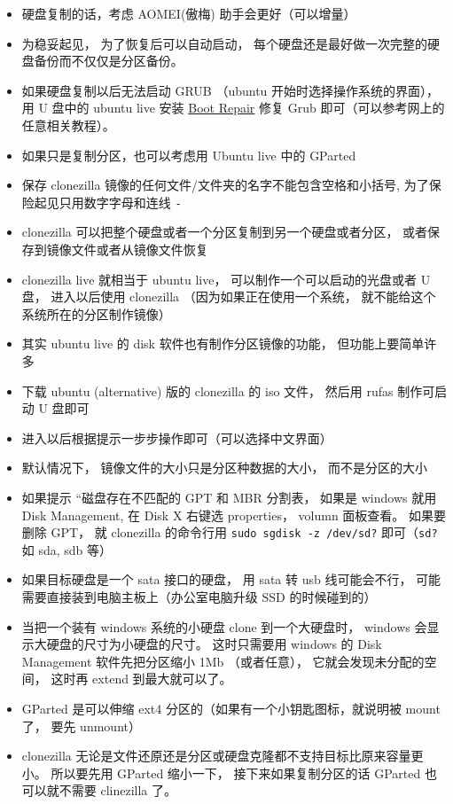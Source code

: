 
\begin{issues}
\issueDraft
\end{issues}

\begin{itemize}
\item 硬盘复制的话，考虑 AOMEI(傲梅) 助手会更好（可以增量）
\item 为稳妥起见， 为了恢复后可以自动启动， 每个硬盘还是最好做一次完整的硬盘备份而不仅仅是分区备份。
\item 如果硬盘复制以后无法启动 GRUB （ubuntu 开始时选择操作系统的界面）， 用 U 盘中的 ubuntu live 安装 \href{https://help.ubuntu.com/community/Boot-Repair}{Boot Repair} 修复 Grub 即可（可以参考网上的任意相关教程）。
\item 如果只是复制分区，也可以考虑用 Ubuntu live 中的 GParted
\item 保存 clonezilla 镜像的任何文件/文件夹的名字不能包含空格和小括号, 为了保险起见只用数字字母和连线 \verb`-`
\item clonezilla 可以把整个硬盘或者一个分区复制到另一个硬盘或者分区， 或者保存到镜像文件或者从镜像文件恢复
\item clonezilla live 就相当于 ubuntu live， 可以制作一个可以启动的光盘或者 U 盘， 进入以后使用 clonezilla （因为如果正在使用一个系统， 就不能给这个系统所在的分区制作镜像）
\item 其实 ubuntu live 的 disk 软件也有制作分区镜像的功能， 但功能上要简单许多

\item 下载 ubuntu (alternative) 版的 clonezilla 的 iso 文件， 然后用 rufas 制作可启动 U 盘即可
\item 进入以后根据提示一步步操作即可（可以选择中文界面）
\item 默认情况下， 镜像文件的大小只是分区种数据的大小， 而不是分区的大小

\item 如果提示 “磁盘存在不匹配的 GPT 和 MBR 分割表， 如果是 windows 就用 Disk Management, 在 Disk X 右键选 properties， volumn 面板查看。 如果要删除 GPT， 就 clonezilla 的命令行用 \verb|sudo sgdisk -z /dev/sd?| 即可（\verb|sd?| 如 sda, sdb 等）
\item 如果目标硬盘是一个 sata 接口的硬盘， 用 sata 转 usb 线可能会不行， 可能需要直接装到电脑主板上（办公室电脑升级 SSD 的时候碰到的）
\item 当把一个装有 windows 系统的小硬盘 clone 到一个大硬盘时， windows 会显示大硬盘的尺寸为小硬盘的尺寸。 这时只需要用 windows 的 Disk Management 软件先把分区缩小 1Mb （或者任意）， 它就会发现未分配的空间， 这时再 extend 到最大就可以了。
\end{itemize}

\begin{itemize}
\item GParted 是可以伸缩 ext4 分区的（如果有一个小钥匙图标，就说明被 mount 了， 要先 unmount）
\item clonezilla 无论是文件还原还是分区或硬盘克隆都不支持目标比原来容量更小。 所以要先用 GParted 缩小一下， 接下来如果复制分区的话 GParted 也可以就不需要 clinezilla 了。
\end{itemize}

